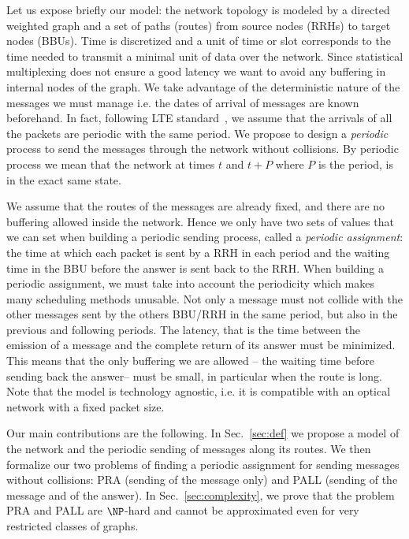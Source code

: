 \documentclass[10pt, conference, letterpaper]{IEEEtran}
\begin{document}
Let us expose briefly our model: the network topology is modeled by a directed weighted graph and a set of paths (routes) from source nodes (RRHs) to target nodes (BBUs). Time is discretized and a unit of time or slot corresponds to the time needed to transmit a minimal unit of data over the network. Since statistical multiplexing does not ensure a good latency we want to avoid any  buffering in internal nodes of the graph.  We take advantage of the deterministic nature of the messages we must manage i.e. the dates of arrival of messages are known beforehand. In fact, following LTE standard~\cite{bouguen2012lte}, we assume that the arrivals of all the packets are periodic with the same period. We propose to design a \emph{periodic} process to send the messages through the network without collisions. By periodic process we mean that the network at times $t$ and $t+P$ where $P$ is the period, is in the exact same state. 

We assume that the routes of the messages are already fixed, and there are no buffering allowed inside the network. Hence we only have two sets of values that we can set when building a periodic sending process, called a \emph{periodic assignment}: the time at which each packet is sent by a RRH in each period and the waiting time in the BBU before the answer is sent back to the RRH. When building a periodic assignment, we must take into account the periodicity which makes many scheduling methods unusable. Not only a message must not collide with the other messages sent by the others BBU/RRH in the same period, but also in the previous and following periods. The latency, that is the time between the emission of a message and the complete return of its answer must be minimized. This means that the only buffering we are allowed -- the waiting time before sending back the answer-- must be small, in particular when the route is long. Note that the model is technology agnostic, i.e. it is compatible with an optical network with a fixed packet size.   

Our main contributions are the following.
 In Sec.~\ref{sec:def} we propose a model of the network and the periodic sending of messages along its routes.
 We then formalize our two problems of finding a periodic assignment for sending messages without collisions: PRA (sending of the message only) and PALL (sending of the message and of the answer).  
In Sec.~\ref{sec:complexity}, we prove that the problem PRA and PALL are $\NP$-hard and cannot be approximated even for very
restricted classes of graphs. 
\end{document}
